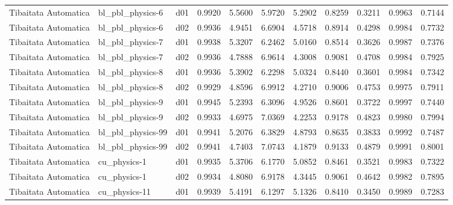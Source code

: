 \begin{longtable}{lllrrrrrrrr}
 Tibaitata Automatica  &      bl\_pbl\_physics-6 &     d01 &   0.9920 &   5.5600 &   5.9720 &       5.2902 &        0.8259 &       0.3211 &           0.9963 &  0.7144 \\
 Tibaitata Automatica  &      bl\_pbl\_physics-6 &     d02 &   0.9936 &   4.9451 &   6.6904 &       4.5718 &        0.8914 &       0.4298 &           0.9984 &  0.7732 \\
 Tibaitata Automatica  &      bl\_pbl\_physics-7 &     d01 &   0.9938 &   5.3207 &   6.2462 &       5.0160 &        0.8514 &       0.3626 &           0.9987 &  0.7376 \\
 Tibaitata Automatica  &      bl\_pbl\_physics-7 &     d02 &   0.9936 &   4.7888 &   6.9614 &       4.3008 &        0.9081 &       0.4708 &           0.9984 &  0.7925 \\
 Tibaitata Automatica  &      bl\_pbl\_physics-8 &     d01 &   0.9936 &   5.3902 &   6.2298 &       5.0324 &        0.8440 &       0.3601 &           0.9984 &  0.7342 \\
 Tibaitata Automatica  &      bl\_pbl\_physics-8 &     d02 &   0.9929 &   4.8596 &   6.9912 &       4.2710 &        0.9006 &       0.4753 &           0.9975 &  0.7911 \\
 Tibaitata Automatica  &      bl\_pbl\_physics-9 &     d01 &   0.9945 &   5.2393 &   6.3096 &       4.9526 &        0.8601 &       0.3722 &           0.9997 &  0.7440 \\
 Tibaitata Automatica  &      bl\_pbl\_physics-9 &     d02 &   0.9933 &   4.6975 &   7.0369 &       4.2253 &        0.9178 &       0.4823 &           0.9980 &  0.7994 \\
 Tibaitata Automatica  &     bl\_pbl\_physics-99 &     d01 &   0.9941 &   5.2076 &   6.3829 &       4.8793 &        0.8635 &       0.3833 &           0.9992 &  0.7487 \\
 Tibaitata Automatica  &     bl\_pbl\_physics-99 &     d02 &   0.9941 &   4.7403 &   7.0743 &       4.1879 &        0.9133 &       0.4879 &           0.9991 &  0.8001 \\
 Tibaitata Automatica  &          cu\_physics-1 &     d01 &   0.9935 &   5.3706 &   6.1770 &       5.0852 &        0.8461 &       0.3521 &           0.9983 &  0.7322 \\
 Tibaitata Automatica  &          cu\_physics-1 &     d02 &   0.9934 &   4.8080 &   6.9178 &       4.3445 &        0.9061 &       0.4642 &           0.9982 &  0.7895 \\
 Tibaitata Automatica  &         cu\_physics-11 &     d01 &   0.9939 &   5.4191 &   6.1297 &       5.1326 &        0.8410 &       0.3450 &           0.9989 &  0.7283 \\

\end{longtable}
